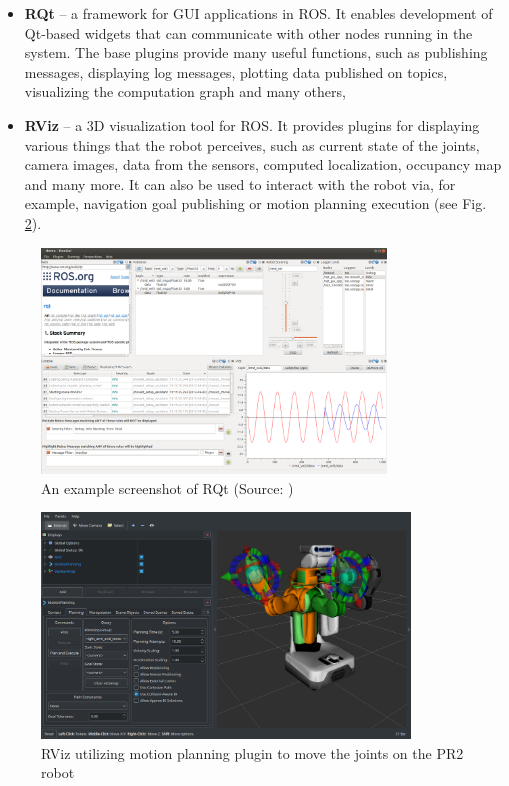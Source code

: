 \documentclass[english,inz,shortabstract]{iithesis}
\begin{document}
        \begin{itemize}[itemsep=0pt, parsep=2pt, topsep=0pt]
            \item \textbf{RQt} -- a framework for GUI applications in ROS. It enables development of Qt-based widgets that can communicate with other nodes running in the system. The base plugins provide many useful functions, such as publishing messages, displaying log messages, plotting data published on topics, visualizing the computation graph and many others,
            \item \textbf{RViz} -- a 3D visualization tool for ROS. It provides plugins for displaying various things that the robot perceives, such as current state of the joints, camera images, data from the sensors, computed localization, occupancy map and many more. It can also be used to interact with the robot via, for example, navigation goal publishing or motion planning execution (see Fig. \ref{fig:rviz_pr2}).
        \end{itemize}

        \begin{figure}[ht]
            \centering
            \captionsetup{margin=2cm}
            \includegraphics[height=6cm]{img/rqt.png}
            \caption{An example screenshot of RQt (Source: \cite{ros:rqt})}
            \label{fig:rqt}
        \end{figure}

\pagebreak

        \begin{figure}[ht]
            \centering
            \captionsetup{margin=2cm}
            \includegraphics[height=6cm]{img/rviz_pr2.png}
            \caption{RViz utilizing motion planning plugin to move the joints on the PR2 robot}
            \label{fig:rviz_pr2}
        \end{figure}
\end{document}
